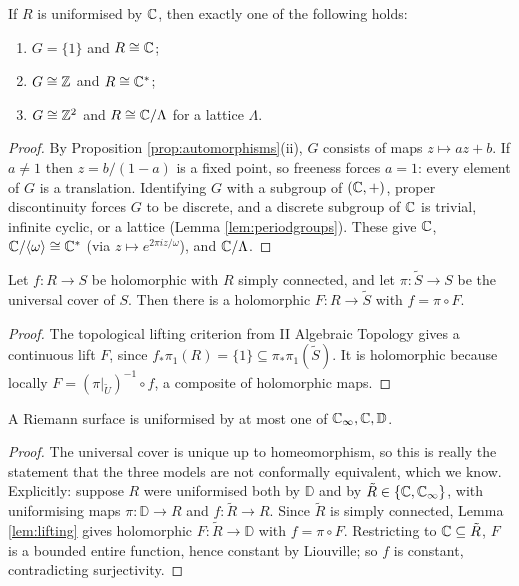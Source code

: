 \documentclass[a4paper]{scrartcl}
\newcommand{\genby}[1]{\langle #1 \rangle}
\newcommand{\Cinf}{\C_\infty}
\newcommand{\disc}{\mathbb{D}}
\newcommand{\Cs}{\C^*}
\begin{document}
\begin{proposition}\label{prop:uniformbyC}
	If $R$ is uniformised by $\mathbb{C}$, then exactly one of the following holds:
	\begin{enumerate}[label=(\roman*)]
		\item $G = \{1\}$ and $R \cong \mathbb{C}$;
		\item $G \cong \mathbb{Z}$ and $R \cong \Cs$;
		\item $G \cong \mathbb{Z}^2$ and $R\cong\mathbb{C}/\Lambda$ for a lattice $\Lambda$.
	\end{enumerate}
\end{proposition}

\begin{proof}
	By Proposition \ref{prop:automorphisms}(ii), $G$ consists of maps $z\mapsto az+b$. If
	$a \neq 1$ then $z = b/(1-a)$ is a fixed point, so freeness forces $a = 1$: every
	element of $G$ is a translation. Identifying $G$ with a subgroup of $(\mathbb{C},+)$, proper
	discontinuity forces $G$ to be discrete, and a discrete subgroup of $\mathbb{C}$ is trivial,
	infinite cyclic, or a lattice (Lemma \ref{lem:periodgroups}). These give
	$\mathbb{C}$, $\C/\genby\omega \cong \Cs$ (via $z\mapsto e^{2\pi i z/\omega}$), and $\mathbb{C}/\Lambda$.
\end{proof}

\begin{lemma}\label{lem:lifting}
	Let $f : R\to S$ be holomorphic with $R$ simply connected, and let $\pi : \tilde S\to S$
	be the universal cover of $S$. Then there is a holomorphic $F : R \to \tilde S$ with
	$f = \pi\circ F$.
\end{lemma}

\begin{proof}
	The topological lifting criterion from II Algebraic Topology gives a continuous lift
	$F$, since $f_*\pi_1(R) = \{1\} \subseteq \pi_*\pi_1(\tilde S)$. It is holomorphic
	because locally $F = (\pi|_{\tilde U})^{-1}\circ f$, a composite of holomorphic maps.
\end{proof}

\begin{proposition}
	A Riemann surface is uniformised by at most one of $\Cinf,\C,\disc$.
\end{proposition}

\begin{proof}
	The universal cover is unique up to homeomorphism, so this is really the statement that
	the three models are not conformally equivalent, which we know. Explicitly: suppose $R$
	were uniformised both by $\disc$ and by $\tilde R \in \{\C,\Cinf\}$, with uniformising
	maps $\pi : \disc \to R$ and $f : \tilde R \to R$. Since $\tilde R$ is simply connected,
	Lemma \ref{lem:lifting} gives holomorphic $F : \tilde R \to \disc$ with $f = \pi\circ F$.
	Restricting to $\mathbb{C} \subseteq \tilde R$, $F$ is a bounded entire function, hence constant
	by Liouville; so $f$ is constant, contradicting surjectivity.
\end{proof}
\end{document}

